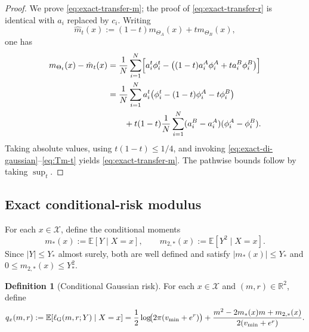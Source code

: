 \documentclass[11pt]{article}
\theoremstyle{definition}
\newtheorem{definition}[theorem]{Definition}
\newcommand{\R}{\mathbb{R}}
\newcommand{\E}{\mathbb{E}}
\newcommand{\abs}[1]{\left\lvert #1 \right\rvert}
\newcommand{\mc}[1]{\mathcal{#1}}
\begin{document}
\begin{proof}
We prove \eqref{eq:exact-transfer-m}; the proof of \eqref{eq:exact-transfer-r}
is identical with $a_i$ replaced by $c_i$. Writing
\[
  \hat m_t(x):=(1-t)m_{\Theta_A}(x)+t m_{\Theta_B}(x),
\]
one has
\begin{align*}
  m_{\Theta_t}(x)-\hat m_t(x)
  &=
  \frac1N\sum_{i=1}^N
  \Bigl[
    a_i^t\phi_i^t
    -
    \bigl((1-t)a_i^A\phi_i^A+t a_i^B\phi_i^B\bigr)
  \Bigr]
  \\
  &=
  \frac1N\sum_{i=1}^N
  a_i^t\bigl(\phi_i^t-(1-t)\phi_i^A-t\phi_i^B\bigr)
  \\
  &\qquad+
  t(1-t)\frac1N\sum_{i=1}^N
  (a_i^B-a_i^A)(\phi_i^A-\phi_i^B).
\end{align*}
Taking absolute values, using $t(1-t)\le 1/4$, and invoking
\eqref{eq:exact-di-gaussian}--\eqref{eq:Tm-t} yields \eqref{eq:exact-transfer-m}.
The pathwise bounds follow by taking $\sup_t$.
\end{proof}

\subsection{Exact conditional-risk modulus}

For each $x\in\mc{X}$, define the conditional moments
\begin{equation}
  m_\ast(x):=\E[Y\mid X=x],
  \qquad
  m_{2,\ast}(x):=\E[Y^2\mid X=x].
  \label{eq:conditional-moments-gaussian}
\end{equation}
Since $\abs{Y}\le Y_\ast$ almost surely, both are well defined and satisfy
$\abs{m_\ast(x)}\le Y_\ast$ and $0\le m_{2,\ast}(x)\le Y_\ast^2$.

\begin{definition}[Conditional Gaussian risk]
\label{def:conditional-gaussian-risk}
For each $x\in\mc{X}$ and $(m,r)\in\R^2$, define
\begin{equation}
  q_x(m,r)
  :=
  \E[\ell_{\rm G}(m,r;Y)\mid X=x]
  =
  \frac12\log\!\bigl(2\pi(v_{\min}+e^r)\bigr)
  +
  \frac{m^2-2m_\ast(x)m+m_{2,\ast}(x)}{2(v_{\min}+e^r)}.
  \label{eq:conditional-gaussian-risk}
\end{equation}
\end{definition}
\end{document}
